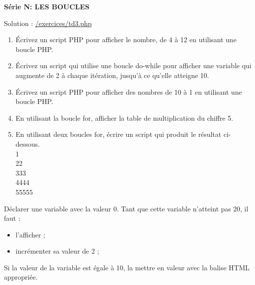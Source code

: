 \documentclass[10pt,a4paper,notitlepage]{article}
\begin{document}
	
	\begin{center}
		\large{\textbf{Série N: \textsc{LES BOUCLES}}}
	\end{center}
	
	Solution : \href{https://exercicesdephp.000webhostapp.com/exercices/td3.php}{\color{blue} /exercices/td3.php}
	\begin{definition}
		\hspace{2ex} 
		\begin{enumerate}
			\item Écrivez un script PHP pour afficher le nombre, de 4 à 12 en utilisant une boucle PHP. 
			\item Écrivez un script  qui utilise une boucle do-while pour afficher une variable qui augmente de 2 à chaque itération, jusqu'à ce qu'elle atteigne 10.
			\item Écrivez un script PHP pour afficher des nombres de 10 à 1 en utilisant une boucle PHP.
			\item En utilisant la boucle for, afficher la table de multiplication du chiffre 5.
			\item En utilisant deux boucles for, écrire un script qui produit le résultat ci-dessous.\\
			1\\
			22\\
			333\\
			4444\\
			55555
		\end{enumerate}
		
	\end{definition}
	\begin{definition}
		\hspace{2ex} Déclarer une variable avec la valeur 0. Tant que cette variable n'atteint pas 20, il faut :
		\begin{itemize}
			\item l'afficher ;
			\item incrémenter sa valeur de 2 ;
		\end{itemize}
		Si la valeur de la variable est égale à 10, la mettre en valeur avec la balise HTML appropriée.
	\end{definition}
\end{document}
